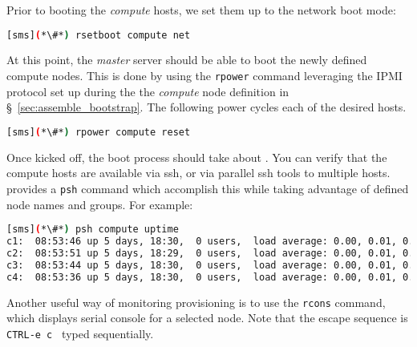 Prior to booting the {\em compute} hosts, we set them up to the network boot
mode:

\begin{lstlisting}[language=bash,keywords={},upquote=true]
[sms](*\#*) rsetboot compute net
\end{lstlisting} 

At this point, the {\em master} server should be able to boot the newly defined
compute nodes. This is done by using the \texttt{rpower} \xCAT{} command
leveraging the IPMI protocol set up during the the {\em compute} node definition
in \S~\ref{sec:assemble_bootstrap}. The following power cycles each of the
desired hosts.


\begin{lstlisting}[language=bash,keywords={},upquote=true]
[sms](*\#*) rpower compute reset
\end{lstlisting} 

Once kicked off, the boot process should take about .  You can verify that
the compute hosts are available via ssh, or via parallel ssh tools to multiple
hosts.  \xCAT{} provides a \texttt{psh} command which accomplish this while
taking advantage of defined node names and groups. For example:

\begin{lstlisting}[language=bash]
[sms](*\#*) psh compute uptime
c1:  08:53:46 up 5 days, 18:30,  0 users,  load average: 0.00, 0.01, 0.05
c2:  08:53:51 up 5 days, 18:29,  0 users,  load average: 0.00, 0.01, 0.05
c3:  08:53:44 up 5 days, 18:30,  0 users,  load average: 0.00, 0.01, 0.05
c4:  08:53:36 up 5 days, 18:30,  0 users,  load average: 0.00, 0.01, 0.05
\end{lstlisting}
Another  useful way of monitoring provisioning is to use  the \texttt{rcons} command,
which displays serial console for a selected node. Note that the escape sequence
is \texttt{CTRL-e c } typed sequentially. 
